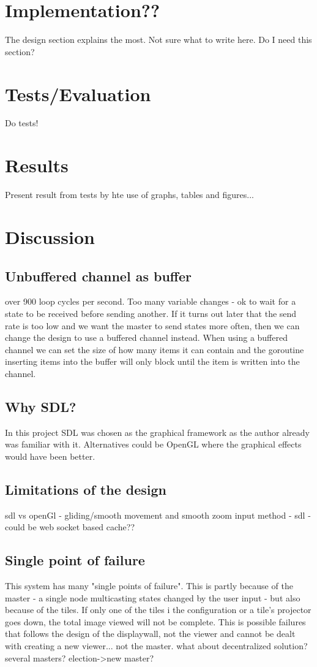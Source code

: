 \documentclass[12pt, a4paper, oneside]{article}
\begin{document}
\section{Implementation??}
The design section explains the most. Not sure what to write here. Do I need this section?
\section{Tests/Evaluation}
Do tests!
\section{Results}
Present result from tests by hte use of graphs, tables and figures...
\newpage
\section{Discussion}
\subsection{Unbuffered channel as buffer}
over 900 loop cycles per second. Too many variable changes - ok to wait for a state to be received before sending another. If it turns out later that the send rate is too low and we want the master to send states more often, then we can change the design to use a buffered channel instead. When using a buffered channel we can set the size of how many items it can contain and the goroutine inserting items into the buffer will only block until the item is written into the channel. 

\subsection{Why SDL?}
In this project SDL was chosen as the graphical framework as the author already was familiar with it. Alternatives could be OpenGL where the graphical effects would have been better. 

\subsection{Limitations of the design}
sdl vs openGl - gliding/smooth movement and smooth zoom
input method - sdl - could be web socket based
cache??

\subsection{Single point of failure}
This system has many "single points of failure". This is partly because of the master - a single node multicasting states changed by the user input - but also because of the tiles. If only one of the tiles i the configuration or a tile's projector goes down, the total image viewed will not be complete. This is possible failures that follows the design of the displaywall, not the viewer and cannot be dealt with creating a new viewer...
not the master. what about decentralized solution? several masters? election->new master?
\newpage
\end{document}
